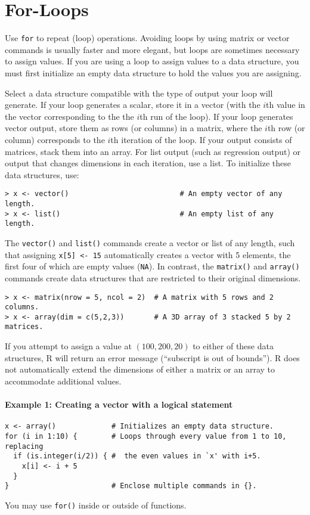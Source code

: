 \section{For-Loops}

Use {\tt for} to repeat (loop) operations.  Avoiding loops by using matrix
or vector commands is usually faster and more elegant, but loops are
sometimes necessary to assign values.  If you are using a loop to
assign values to a data structure, you must first initialize an empty
data structure to hold the values you are assigning.

Select a data structure compatible with the type of output your loop
will generate.  If your loop generates a scalar, store it in a vector
(with the $i$th value in the vector corresponding to the the $i$th run
of the loop).  If your loop generates vector output, store them as
rows (or columns) in a matrix, where the $i$th row (or column)
corresponds to the $i$th iteration of the loop.  If your output
consists of matrices, stack them into an array.  For list output (such
as regression output) or output that changes dimensions in each
iteration, use a list.  To initialize these data structures, use:
\begin{verbatim}
> x <- vector()                          # An empty vector of any length.
> x <- list()                            # An empty list of any length.  
\end{verbatim}
The {\tt vector()} and {\tt list()} commands create a vector or list
of any length, such that assigning {\tt x[5] <- 15} automatically
creates a vector with 5 elements, the first four of which are empty
values ({\tt NA}).  In contrast, the {\tt matrix()} and {\tt array()}
commands create data structures that are restricted to their original
dimensions.  
\begin{verbatim}
> x <- matrix(nrow = 5, ncol = 2)  # A matrix with 5 rows and 2 columns.
> x <- array(dim = c(5,2,3))       # A 3D array of 3 stacked 5 by 2 matrices.
\end{verbatim}
If you attempt to assign a value at $(100, 200, 20)$ to either of
these data structures, R will return an error message (``subscript is
out of bounds'').  R does not automatically extend the
dimensions of either a matrix or an array to accommodate additional
values.  

\paragraph{Example 1: Creating a vector with a logical statement} 
\begin{verbatim}
x <- array()             # Initializes an empty data structure.  
for (i in 1:10) {        # Loops through every value from 1 to 10, replacing
  if (is.integer(i/2)) { #  the even values in `x' with i+5.
    x[i] <- i + 5 
  }      
}                        # Enclose multiple commands in {}.  
\end{verbatim}
You may use {\tt for()} inside or outside of functions.  


